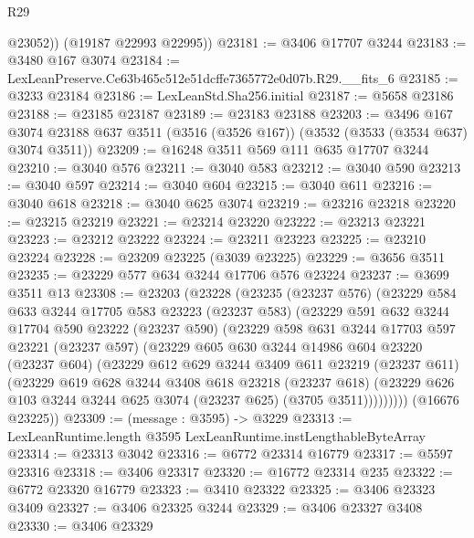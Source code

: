 \begin{lexlean}{R29}
\begin{coremodule}
          @23052))
      (@19187 @22993 @22995))
@23181 := @3406 @17707 @3244
@23183 := @3480 @167 @3074
@23184 := LexLeanPreserve.Ce63b465c512e51dcffe7365772e0d07b.R29.__fits_6
@23185 := @3233 @23184
@23186 := LexLeanStd.Sha256.initial
@23187 := @5658 @23186
@23188 := @23185 @23187
@23189 := @23183 @23188
@23203 := @3496
    @167
    @3074
    @23188
    @637
    @3511
    (@3516 (@3526 @167))
    (@3532 (@3533 (@3534 @637) @3074 @3511))
@23209 := @16248 @3511 @569 @111 @635 @17707 @3244
@23210 := @3040 @576
@23211 := @3040 @583
@23212 := @3040 @590
@23213 := @3040 @597
@23214 := @3040 @604
@23215 := @3040 @611
@23216 := @3040 @618
@23218 := @3040 @625 @3074
@23219 := @23216 @23218
@23220 := @23215 @23219
@23221 := @23214 @23220
@23222 := @23213 @23221
@23223 := @23212 @23222
@23224 := @23211 @23223
@23225 := @23210 @23224
@23228 := @23209 @23225 (@3039 @23225)
@23229 := @3656 @3511
@23235 := @23229 @577 @634 @3244 @17706 @576 @23224
@23237 := @3699 @3511 @13
@23308 := @23203
    (@23228
      (@23235
        (@23237 @576)
        (@23229
          @584
          @633
          @3244
          @17705
          @583
          @23223
          (@23237 @583)
          (@23229
            @591
            @632
            @3244
            @17704
            @590
            @23222
            (@23237 @590)
            (@23229
              @598
              @631
              @3244
              @17703
              @597
              @23221
              (@23237 @597)
              (@23229
                @605
                @630
                @3244
                @14986
                @604
                @23220
                (@23237 @604)
                (@23229
                  @612
                  @629
                  @3244
                  @3409
                  @611
                  @23219
                  (@23237 @611)
                  (@23229
                    @619
                    @628
                    @3244
                    @3408
                    @618
                    @23218
                    (@23237 @618)
                    (@23229 @626 @103 @3244 @3244 @625 @3074 (@23237 @625) (@3705 @3511)))))))))
      (@16676 @23225))
@23309 := (message : @3595) -> @3229
@23313 := LexLeanRuntime.length @3595 LexLeanRuntime.instLengthableByteArray
@23314 := @23313 @3042
@23316 := @6772 @23314 @16779
@23317 := @5597 @23316
@23318 := @3406 @23317
@23320 := @16772 @23314 @235
@23322 := @6772 @23320 @16779
@23323 := @3410 @23322
@23325 := @3406 @23323 @3409
@23327 := @3406 @23325 @3244
@23329 := @3406 @23327 @3408
@23330 := @3406 @23329

\end{coremodule}
\end{lexlean}
